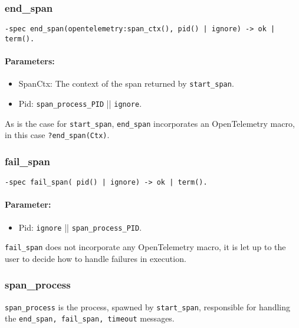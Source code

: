         \subsubsection{end\_span}
            \begin{verbatim}                
-spec end_span(opentelemetry:span_ctx(), pid() | ignore) -> ok | term().
            \end{verbatim}
            \paragraph{Parameters:}
            \begin{itemize}
                \item SpanCtx: The context of the span returned by \texttt{start\_span}.
                \item Pid: \texttt{span\_process\_PID} || \texttt{ignore}.
            \end{itemize}

    As is the case for \texttt{start\_span}, \texttt{end\_span} incorporates an OpenTelemetry macro, in this case \texttt{?end\_span(Ctx)}. \\

        \subsubsection{fail\_span}
        \begin{verbatim}        
-spec fail_span( pid() | ignore) -> ok | term().
        \end{verbatim}
        \paragraph{Parameter:}
             \begin{itemize}
                \item Pid: \texttt{ignore} || \texttt{span\_process\_PID}.
            \end{itemize}
            \texttt{fail\_span} does not incorporate any OpenTelemetry macro, it is let up to the user to decide how to handle failures in execution. \\
        

        \subsubsection{span\_process}
            \texttt{span\_process} is the process, spawned by \texttt{start\_span}, responsible for handling the \texttt{end\_span, fail\_span, timeout} messages.

